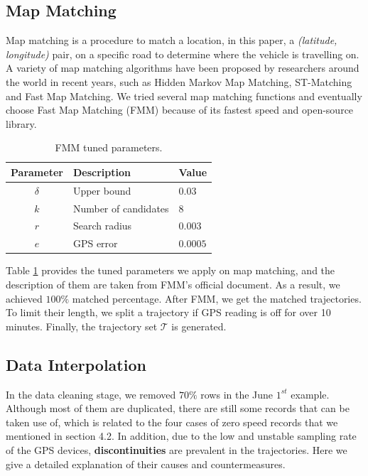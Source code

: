 \subsection{Map Matching}
Map matching\cite{mm} is a procedure to match a location, in this paper, a \textit{(latitude, longitude)} pair, on a specific road to determine where the vehicle is travelling on. A variety of map matching algorithms have been proposed by researchers around the world in recent years, such as Hidden Markov Map Matching\cite{HMMM}, ST-Matching\cite{stmm} and Fast Map Matching\cite{fmm}. We tried several map matching functions and eventually choose Fast Map Matching (FMM) because of its fastest speed and open-source library.

\begin{table}[htb]
  \begin{center}
      \caption{FMM tuned parameters.}
      \label{fmm_table}
      \begin{tabular}{cll}
          \toprule

          \textbf{Parameter} & \textbf{Description} & \textbf{Value}\\

          \midrule

          $\delta$ & Upper bound & $0.03$\\
          $k$ & Number of candidates & $8$\\
          $r$ & Search radius & $0.003$\\
          $e$ & GPS error & $0.0005$\\

          \bottomrule
      \end{tabular}
  \end{center}
\end{table}

Table \ref{fmm_table} provides the tuned parameters we apply on map matching, and the description of them are taken from FMM's official document. As a result, we achieved $100\%$ matched percentage. After FMM, we get the matched trajectories. To limit their length, we split a trajectory if GPS reading is off for over 10 minutes. Finally, the trajectory set $\mathcal{T}$ is generated.

\subsection{Data Interpolation}
In the data cleaning stage, we removed $70\%$ rows in the June $1^{st}$ example. Although most of them are duplicated, there are still some records that can be taken use of, which is related to the four cases of zero speed records that we mentioned in section 4.2. In addition, due to the low and unstable sampling rate of the GPS devices, \textbf{discontinuities} are prevalent in the trajectories. Here we give a detailed explanation of their causes and countermeasures.

